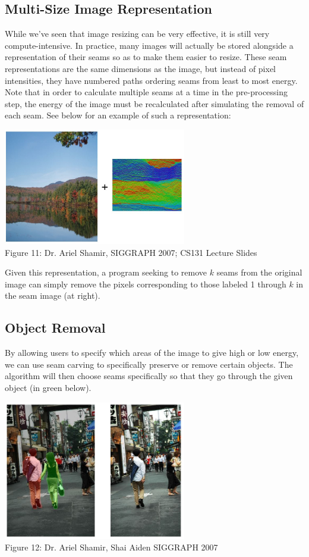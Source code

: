 \documentclass{article}
\begin{document}
\subsection{Multi-Size Image Representation}
While we've seen that image resizing can be very effective, it is still very compute-intensive. In practice, many images will actually be stored alongside a representation of their seams so as to make them easier to resize. These seam representations are the same dimensions as the image, but instead of pixel intensities, they have numbered paths ordering seams from least to most energy. Note that in order to calculate multiple seams at a time in the pre-processing step, the energy of the image must be recalculated after simulating the removal of each seam. See below for an example of such a representation:
\begin{center}
\includegraphics[width=8cm]{resizing_representation.JPG} \\
Figure 11: Dr. Ariel Shamir, SIGGRAPH 2007; CS131 Lecture Slides
\end{center}
Given this representation, a program seeking to remove $k$ seams from the original image can simply remove the pixels corresponding to those labeled 1 through $k$ in the seam image (at right).
\subsection{Object Removal}
By allowing users to specify which areas of the image to give high or low energy, we can use seam carving to specifically preserve or remove certain objects. The algorithm will then choose seams specifically so that they go through the given object (in green below).

\begin{center}
\includegraphics[width=8cm]{object_removal.JPG} \\
Figure 12: Dr. Ariel Shamir, Shai Aiden SIGGRAPH 2007
\end{center}
\end{document}
